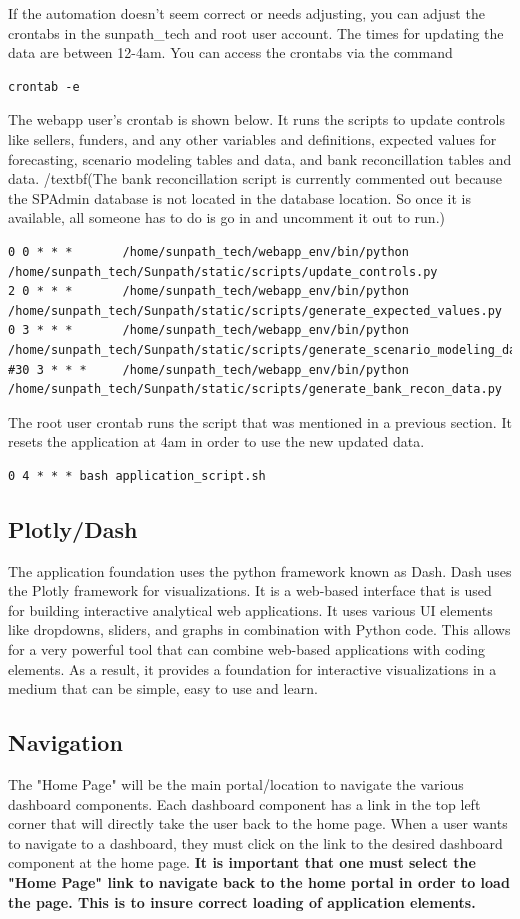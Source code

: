 \documentclass[titlepage]{article}
\begin{document}
If the automation doesn't seem correct or needs adjusting, you can adjust the crontabs in the sunpath\_tech and root user account. The times for updating the data are between 12-4am. You can access the crontabs via the command
\begin{verbatim}
crontab -e
\end{verbatim}
The webapp user's crontab is shown below. It runs the scripts to update controls like sellers, funders, and any other variables and definitions, expected values for forecasting, scenario modeling tables and data, and bank reconcillation tables and data. /textbf(The bank reconcillation script is currently commented out because the SPAdmin database is not located in the database location. So once it is available, all someone has to do is go in and uncomment it out to run.) 
\begin{verbatim}
0 0 * * *       /home/sunpath_tech/webapp_env/bin/python 
/home/sunpath_tech/Sunpath/static/scripts/update_controls.py
2 0 * * *       /home/sunpath_tech/webapp_env/bin/python 
/home/sunpath_tech/Sunpath/static/scripts/generate_expected_values.py
0 3 * * *       /home/sunpath_tech/webapp_env/bin/python 
/home/sunpath_tech/Sunpath/static/scripts/generate_scenario_modeling_data.py
#30 3 * * *     /home/sunpath_tech/webapp_env/bin/python 
/home/sunpath_tech/Sunpath/static/scripts/generate_bank_recon_data.py
\end{verbatim}
The root user crontab runs the script that was mentioned in a previous section. It resets the application at 4am in order to use the new updated data.
\begin{verbatim}
0 4 * * * bash application_script.sh
\end{verbatim}

\subsection{Plotly/Dash}
The application foundation uses the python framework known as Dash. Dash uses the Plotly framework for visualizations. It is a web-based interface that is used for building interactive analytical web applications. It uses various UI elements like dropdowns, sliders, and graphs in combination with Python code. This allows for a very powerful tool that can combine web-based applications with coding elements. As a result, it provides a foundation for interactive visualizations in a medium that can be simple, easy to use and learn.  

\subsection{Navigation}
The "Home Page" will be the main portal/location to navigate the various dashboard components. Each dashboard component has a link in the top left corner that will directly take the user back to the home page. When a user wants to navigate to a dashboard, they must click on the link to the desired dashboard component at the home page. \textbf{It is important that one must select the "Home Page" link to navigate back to the home portal in order to load the page. This is to insure correct loading of application elements.}
\end{document}
